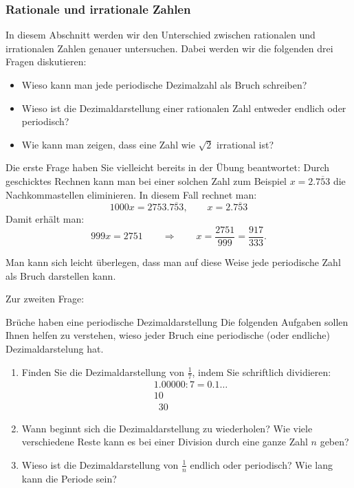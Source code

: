 

\subsubsection{Rationale und irrationale Zahlen}

In diesem Abschnitt werden wir den Unterschied zwischen rationalen und irrationalen Zahlen genauer untersuchen. Dabei werden wir die folgenden drei Fragen diskutieren:
\begin{itemize}
    \item Wieso kann man jede periodische Dezimalzahl als Bruch schreiben?
    \item Wieso ist die Dezimaldarstellung einer rationalen Zahl entweder endlich oder periodisch?
    \item Wie kann man zeigen, dass eine Zahl wie \(\sqrt{2}\) irrational ist?
\end{itemize}

Die erste Frage haben Sie vielleicht bereits in der Übung  beantwortet: Durch geschicktes Rechnen kann man bei einer solchen Zahl zum Beispiel \( x = 2.\overline{753}\) die Nachkommastellen eliminieren. In diesem Fall rechnet man:
\[
    1000x = 2753.\overline{753},
    \qquad
    x = 2.\overline{753}
\]
Damit erhält man:
\[
    999x = 2751
    \qquad\Longrightarrow\qquad
    x = \frac{2751}{999}
    = \frac{917}{333}.
\]

Man kann sich leicht überlegen, dass man auf diese Weise jede periodische Zahl als Bruch darstellen kann.

Zur zweiten Frage:

\begin{LA}
    {Brüche haben eine periodische Dezimaldarstellung}{}
    Die folgenden Aufgaben sollen Ihnen helfen zu verstehen, wieso jeder Bruch eine periodische (oder endliche) Dezimaldarstelung hat.
    \begin{enumerate}
        \item Finden Sie die Dezimaldarstellung von \(\frac{1}{7}\), indem Sie schriftlich dividieren:
              \begin{align*}
                   & 1.00000 : 7 = 0.1\ldots \\
                   & 10                      \\
                   & \phantom{1}30
              \end{align*}
              \vspace*{2 cm}
        \item 	Wann beginnt sich die Dezimaldarstellung zu wiederholen? Wie viele verschiedene Reste kann es bei einer Division durch eine ganze Zahl \(n\) geben?
        \item 	Wieso ist die Dezimaldarstellung von \(\frac{1}{n}\) endlich oder periodisch? Wie lang kann die Periode sein?
    \end{enumerate}
\end{LA}












